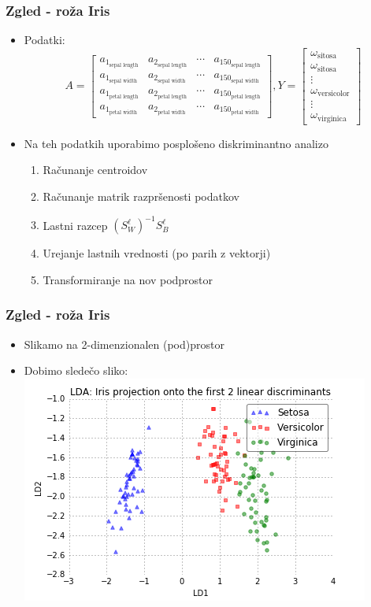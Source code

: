 \documentclass{beamer}
\begin{document}
\begin{frame}
\frametitle{Zgled - roža Iris}
\begin{itemize}
\item Podatki:
\[
A =
\begin{bmatrix}
	a_{1_{\text{sepal  length}}} & a_{2_{\text{sepal  length}}} & \cdots  & a_{150_{\text{sepal  length}}} \\
	a_{1_{\text{sepal  width}}} & a_{2_{\text{sepal width}}} & \cdots  & a_{150_{\text{sepal  width}}} \\
	a_{1_{\text{petal  length}}} & a_{2_{\text{petal  length}}} & \cdots  & a_{150_{\text{petal  length}}} \\
	a_{1_{\text{petal  width}}} & a_{2_{\text{petal  width}}} & \cdots  & a_{150_{\text{petal  width}}}
\end{bmatrix}
, Y = 
\begin{bmatrix}
	\omega_{\text{sitosa}}\\
	\omega_{\text{sitosa}}\\
	\vdots \\
	\omega_{\text{versicolor}}\\
	\vdots \\
	\omega_{\text{virginica}}
\end{bmatrix}
\]

\item Na teh podatkih uporabimo posplošeno diskriminantno analizo
\begin{enumerate}
\item Računanje centroidov
\item Računanje matrik razpršenosti podatkov
\item Lastni razcep $(S_W^\ell)^{-1}S_B^ \ell $
\item Urejanje lastnih vrednosti (po parih z vektorji)
\item Transformiranje na nov podprostor
\end{enumerate}
\end{itemize}
\end{frame}


\begin{frame}
\frametitle{Zgled - roža Iris}
\begin{itemize}
\item Slikamo na 2-dimenzionalen (pod)prostor
\item Dobimo sledečo sliko:
\includegraphics[scale = 0.65]{Iris3}
\end{itemize}
\end{frame}
\end{document}
